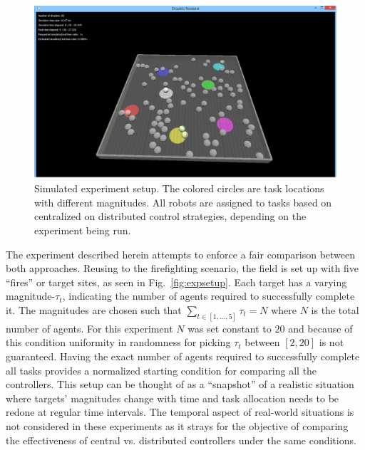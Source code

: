 \documentclass[defaultstyle,12pt]{thesis}
\begin{document}
\begin{figure}[!ht]
\centering\includegraphics[width=.65\textwidth]{../assets/dsim.png}
\centering\caption{Simulated experiment setup. The colored circles are task locations with different magnitudes. All robots are assigned to tasks based on centralized on distributed control strategies, depending on the experiment being run.}
\end{figure}

The experiment described herein attempts to enforce a fair comparison between both approaches. Reusing to the firefighting scenario, the field is set up with five ``fires'' or target sites, as seen in Fig.~\ref{fig:expsetup}. Each target has a varying magnitude-$\tau_t$, indicating the number of agents required to successfully complete it. The magnitudes are chosen such that $\sum_{t \in [1,\ldots,5]}\tau_t = N$ where $N$ is the total number of agents. For this experiment $N$ was set constant to $20$ and because of this condition uniformity in randomness for picking $\tau_t$ between $[2, 20]$ is not guaranteed. Having the exact number of agents required to successfully complete all tasks provides a normalized starting condition for comparing all the controllers. This setup can be thought of as a ``snapshot'' of a realistic situation where targets' magnitudes change with time and task allocation needs to be redone at regular time intervals. The temporal aspect of real-world situations is not considered in these experiments as it strays for the objective of comparing the effectiveness of central vs. distributed controllers under the same conditions.
\end{document}
